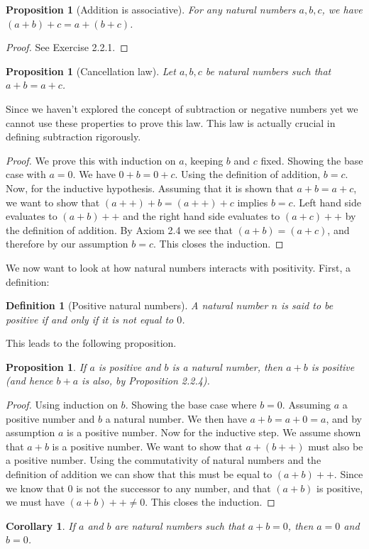 \documentclass[a4paper, twocolumn]{report}
\newcounter{dummy} \numberwithin{dummy}{section}
\newtheorem{defn}[dummy]{Definition}
\newtheorem{prp}[dummy]{Proposition}
\newtheorem{crl}[dummy]{Corollary}
\newcommand{\dplus}{{+}{+}}
\begin{document}
\begin{prp}[Addition is associative]
  For any natural numbers $a, b, c$, we have $(a + b) + c = a + (b + c)$.  
\end{prp}
\begin{proof}
  See Exercise 2.2.1.
\end{proof}

\begin{prp}[Cancellation law]
  Let $a, b, c$ be natural numbers such that $a + b = a + c$. 
\end{prp}

Since we haven't explored the concept of subtraction or negative numbers yet we
cannot use these properties to prove this law. This law is actually crucial in
defining subtraction rigorously. 

\begin{proof}
  We prove this with induction on $a$, keeping $b$ and $c$ fixed.  Showing the
  base case with $a = 0$. We have $0 + b = 0 + c$. Using the definition of
  addition, $b = c$. Now, for the inductive hypothesis.  Assuming that it is
  shown that $ a + b  = a + c$, we want to show that $(a\dplus) + b = (a\dplus)
  + c$ implies $b = c$.  Left hand side evaluates to $(a+b)\dplus$ and the
  right hand side evaluates to $(a + c)\dplus$ by the definition of addition.
  By Axiom 2.4 we see that $(a + b) = (a + c)$, and therefore by our assumption
  $b = c$. This closes the induction.
\end{proof}

We now want to look at how natural numbers interacts with positivity. First, a definition:
\begin{defn}[Positive natural numbers]
  A natural number $n$ is said to be \textit{positive} if and only if it is not equal to $0$.
\end{defn}

This leads to the following proposition.
\begin{prp}
  If $a$ is positive and $b$ is a natural number, then $a + b$ is positive (and hence $b + a$ is also, by Proposition 2.2.4).
\end{prp}
\begin{proof}
  Using induction on $b$. Showing the base case where $b = 0$.  Assuming $a$ a
  positive number and $b$ a natural number.  We then have $ a + b = a + 0 = a$,
  and by assumption $a$ is a positive number.  Now for the inductive step. We
  assume shown that $a + b$ is a positive number.  We want to show that $a + (
  b\dplus)$ must also be a positive number. Using the commutativity of natural
  numbers and the definition of addition we can show that this must be equal to
  $(a + b)\dplus$. Since we know that $0$ is not the successor to any number,
  and that $(a + b)$ is positive, we must have $(a + b)\dplus \neq 0$. This
  closes the induction.
\end{proof}

\begin{crl}
  If $a$ and $b$ are natural numbers such that $a + b = 0$, then $a = 0$ and $b = 0$. 
\end{crl}
\end{document}
